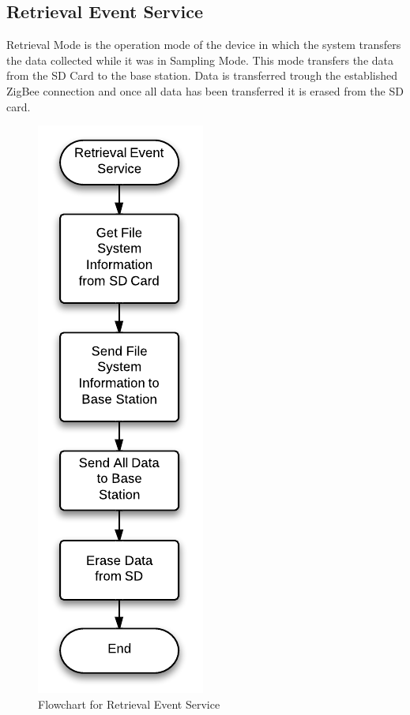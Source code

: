 \subsection{Retrieval Event Service}
Retrieval Mode is the operation mode of the device in which the system transfers the data collected while it was in Sampling Mode. This mode transfers the data from the SD Card to the base station. Data is transferred trough the established ZigBee connection and once all data has been transferred it is erased from the SD card.
\begin{figure}[H]
	\centering
	\includegraphics[scale=1.0]{img/RetrievalEventService}
	\caption{Flowchart for Retrieval Event Service \label{fig:retrivalMode}}
\end{figure}

